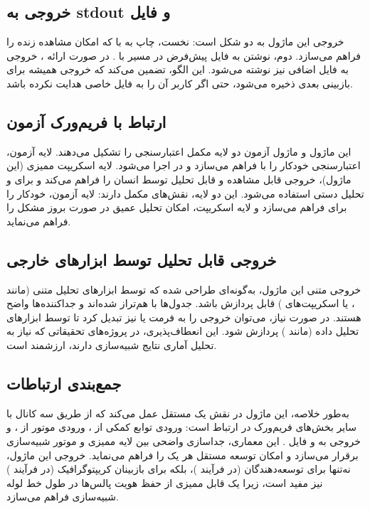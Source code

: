 \subsection{خروجی به stdout و فایل}

خروجی این ماژول به دو شکل است: نخست، چاپ به  با  که امکان مشاهده زنده را فراهم می‌سازد. دوم، نوشتن به فایل پیش‌فرض در مسیر  با . در صورت ارائه ، خروجی به فایل اضافی نیز نوشته می‌شود. این الگو، تضمین می‌کند که خروجی همیشه برای بازبینی بعدی ذخیره می‌شود، حتی اگر کاربر آن را به فایل خاصی هدایت نکرده باشد.

\subsection{ارتباط با فریم‌ورک آزمون}

این ماژول و ماژول آزمون  دو لایه مکمل اعتبارسنجی را تشکیل می‌دهند. لایه آزمون، اعتبارسنجی خودکار را با  فراهم می‌سازد و در  اجرا می‌شود. لایه اسکریپت ممیزی (این ماژول)، خروجی قابل مشاهده و قابل تحلیل توسط انسان را فراهم می‌کند و برای  و تحلیل دستی استفاده می‌شود. این دو لایه، نقش‌های مکمل دارند: لایه آزمون،  خودکار را برای  فراهم می‌سازد و لایه اسکریپت، امکان تحلیل عمیق در صورت بروز مشکل را فراهم می‌نماید.

\subsection{خروجی قابل تحلیل توسط ابزارهای خارجی}

خروجی متنی این ماژول، به‌گونه‌ای طراحی شده که توسط ابزارهای تحلیل متنی (مانند ،  یا اسکریپت‌های ) قابل پردازش باشد. جدول‌ها با  هم‌تراز شده‌اند و جداکننده‌ها واضح هستند. در صورت نیاز، می‌توان خروجی را به فرمت  یا  نیز تبدیل کرد تا توسط ابزارهای تحلیل داده (مانند ) پردازش شود. این انعطاف‌پذیری، در پروژه‌های تحقیقاتی که نیاز به تحلیل آماری نتایج شبیه‌سازی دارند، ارزشمند است.

\subsection{جمع‌بندی ارتباطات}

به‌طور خلاصه، این ماژول در نقش یک  مستقل عمل می‌کند که از طریق سه کانال با سایر بخش‌های فریم‌ورک در ارتباط است: ورودی توابع کمکی از ، ورودی موتور  از ، و خروجی به  و فایل . این معماری، جداسازی واضحی بین لایه ممیزی و موتور شبیه‌سازی برقرار می‌سازد و امکان توسعه مستقل هر یک را فراهم می‌نماید. خروجی این ماژول، نه‌تنها برای توسعه‌دهندگان (در فرآیند )، بلکه برای بازبینان کریپتوگرافیک (در فرآیند ) نیز مفید است، زیرا یک  قابل ممیزی از حفظ هویت پالس‌ها در طول خط لوله شبیه‌سازی فراهم می‌سازد.
